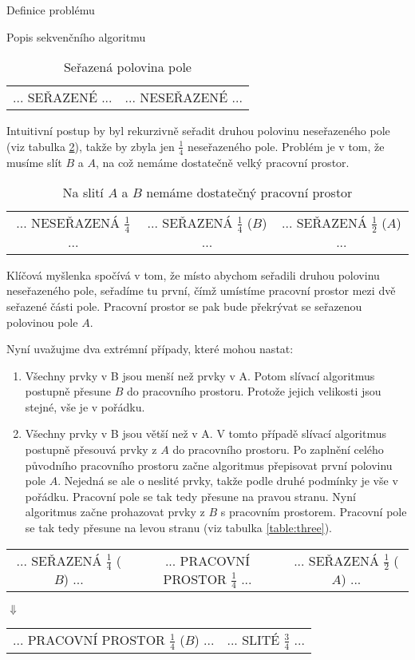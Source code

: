 \documentclass[a4paper,11pt]{article}
\begin{document}
\begin{section}{Definice problému}
\begin{subsection}{Popis sekvenčního algoritmu}
\begin{table}[ht]
\centering
\begin{tabular}{|c|c|}
... SEŘAZENÉ ... & ... NESEŘAZENÉ ...
\end{tabular}
\caption{Seřazená polovina pole}
\label{table:one}
\end{table}

Intuitivní postup by byl rekurzivně seřadit druhou polovinu neseřazeného pole (viz tabulka \ref{table:two}), takže by zbyla jen $\frac{1}{4}$
neseřazeného pole. Problém je v tom, že musíme slít $B$ a $A$, na což nemáme dostatečně velký pracovní prostor.


\begin{table}[ht]
\centering
\begin{tabular}{|c|c|c|}
... NESEŘAZENÁ $\frac{1}{4}$ ... & ... SEŘAZENÁ $\frac{1}{4}$ ($B$) ... & ... SEŘAZENÁ $\frac{1}{2}$ ($A$) ...
\end{tabular}
\caption{Na slití $A$ a $B$ nemáme dostatečný pracovní prostor}
\label{table:two}
\end{table}

Klíčová myšlenka spočívá v tom, že místo abychom seřadili druhou polovinu neseřazeného pole, seřadíme tu první,
čímž umístíme pracovní prostor mezi dvě seřazené části pole. Pracovní prostor se pak bude překrývat se seřazenou 
polovinou pole $A$.

Nyní uvažujme dva extrémní případy, které mohou nastat:
\begin{enumerate}
	\item Všechny prvky v B jsou menší než prvky v A. Potom slívací algoritmus postupně přesune $B$ do pracovního
prostoru. Protože jejich velikosti jsou stejné, vše je v pořádku.

	\item Všechny prvky v B jsou větší než v A. V tomto případě slívací algoritmus postupně přesouvá prvky z $A$
do pracovního prostoru. Po zaplnění celého původního pracovního prostoru začne algoritmus přepisovat první polovinu
pole $A$. Nejedná se ale o neslité prvky, takže podle druhé podmínky je vše v pořádku. Pracovní pole se tak tedy 
přesune na pravou stranu. Nyní algoritmus začne prohazovat prvky z $B$ s pracovním prostorem. Pracovní pole se tak 
tedy přesune na levou stranu (viz tabulka \ref{table:three}).
\end{enumerate}

\begin{table}[ht]
\centering
\begin{tabular}{|c|c|c|}
... SEŘAZENÁ $\frac{1}{4}$ ($B$) ... & ... PRACOVNÍ PROSTOR $\frac{1}{4}$ ... & ... SEŘAZENÁ $\frac{1}{2}$ ($A$) ...
\end{tabular}
\begin{center}
$\Downarrow$
\end{center}
\begin{tabular}{|c|c|}
... PRACOVNÍ PROSTOR $\frac{1}{4}$ ($B$) ... & ... SLITÉ $\frac{3}{4}$ ...
\end{tabular}


\end{table}
\end{subsection}
\end{section}
\end{document}
